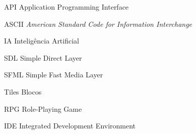 \begin{siglas}
  \item[API] Application Programming Interface
  \item[ASCII] \textit{American Standard Code for Information Interchange}
  \item[IA] Inteligência Artificial
  \item[SDL] Simple Direct Layer
  \item[SFML] Simple Fast Media Layer
  \item[Tiles] Blocos
  \item[RPG] Role-Playing Game 
  \item[IDE] Integrated Development Environment

\end{siglas}

